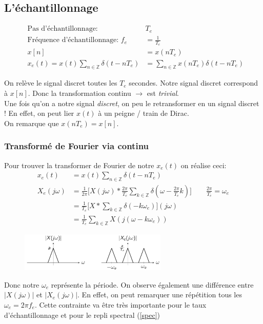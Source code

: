 \documentclass{report}
\begin{document}
\subsection{L'échantillonnage}
\begin{figure}
\centering
\begin{align*}
\text{Pas d'échantillonnage: } &T_e\\
\text{Fréquence d'échantillonnage: }  f_e &= \frac{1}{T_e}\\
x[n] &= x(nT_e)\\
x_e(t)=x(t) \sum_{n \in \mathbb{Z}} \delta(t-nT_e)&= \sum_{n \in \mathbb{Z}} x(nT_e)\delta(t-nT_e)
\end{align*}
\end{figure}
On relève le signal discret toutes les $T_e$ secondes. Notre signal discret correspond à $x[n]$. Donc la transformation continu $\rightarrow$ est \textit{trivial}.\\
Une fois qu'on a notre signal \textit{discret}, on peu le retransformer en un signal discret ! En effet, on peut lier $x(t)$ à un peigne / train de Dirac.\\
On remarque que $x(nT_e) = x[n]$.

\subsubsection{Transformé de Fourier via continu}
Pour trouver la transformer de Fourier de notre $x_e(t)$ on réalise ceci:
\begin{align*}
x_e(t)&= x(t) \sum_{n \in \mathbb{Z}} \delta(t-nT_e)\\
X_e(j\omega) &= \frac{1}{2\pi} \Bigr[ X(j\omega) \ast \frac{2\pi}{T_e} \sum_{k \in \mathbb{Z}} \delta(\omega- \frac{2\pi}{T_e}k) \Big] \qquad  \frac{2\pi}{T_e} = \omega_e\\
&= \frac{1}{T_e} \Bigr[ X \ast \sum_{k \in \mathbb{Z}} \delta(-k \omega_e) \Bigr](j\omega)\\
&= \frac{1}{T_e} \sum_{k \in \mathbb{Z}} X(j(\omega -k \omega_e))
\end{align*}
\newpage
\begin{figure}
\centering
\includegraphics[width=7cm]{img/rep.png}
\end{figure}
Donc notre $\omega_e$ représente la période. On observe également une différence entre $|X(j\omega)|$ et $|X_e(j\omega)|$. En effet, on peut remarquer une répétition tous les $\omega_e = 2 \pi f_e$. Cette contrainte va être très importante pour le taux d'échantillonnage et pour le repli spectral (\ref{spec})
\end{document}
